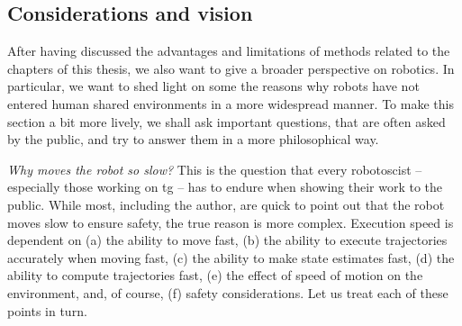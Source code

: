 \subsection{Considerations and vision}
\label{sec:discussion_vision}

After having discussed the advantages and limitations of
methods related to the chapters of this thesis, we also want
to give a broader perspective on robotics. In particular, we
want to shed light on some the reasons why robots have not
entered human shared environments in a more widespread
manner. To make this section a bit more lively, we shall ask
important questions, that are often asked by the public, and
try to answer them in a more philosophical way.


\textit{Why moves the robot so slow?} This is the question that every robotoscist
-- especially those working on \ac{tg} --
has to endure when showing their work to the public. While most, including the
author, are quick to point out that the robot moves slow to ensure safety, the
true reason is more complex. Execution speed is dependent on
(a) the ability to move fast,
(b) the ability to execute trajectories accurately when moving fast,
(c) the ability to make state estimates fast,
(d) the ability to compute trajectories fast,
(e) the effect of speed of motion on the environment,
and, of course,  (f) safety considerations.
Let us treat each of these
points in turn. 
